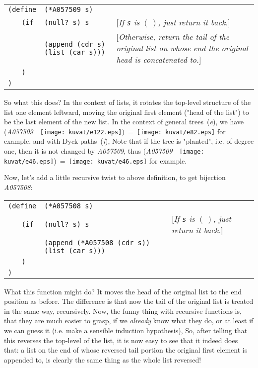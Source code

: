 \documentclass[11pt]{article} %
\newcommand{\catint}[1]{({\it #1})}
\newcommand{\autname}[1]{{\it *#1}}
\newcommand{\scmsym}[1]{{\tt{#1}}}
\newcommand{\scmcode}[1]{{\tt{#1}}}
\newenvironment{scmdefinefun5}{\begin{tabular}{l l l l p{5cm}}}{\end{tabular}}
\newcommand{\scmexmcomment}[1]{[\emph{#1}]}
\newcommand{\nilatom}{\ensuremath{\mathbf{(~)}}\xspace}
\begin{document}
\begin{scmdefinefun5}
\multicolumn{2}{l}{\scmcode{(define}} & \multicolumn{2}{l}{\scmcode{(*A057509 s)}}\\
 & \scmcode{(if} & \multicolumn{2}{l}{\scmcode{(null? s) s}}
 & \scmexmcomment{If \scmsym{s} is \nilatom, just return it back.}\\
 &               & \multicolumn{2}{l}{\scmcode{(append (cdr s) (list (car s)))}}
& \scmexmcomment{Otherwise, return the tail of the original list on whose end the original head is concatenated to.}\\
& \scmcode{)}\\
\scmcode{)}\\
\end{scmdefinefun5}
So what this does? In the context of lists, it rotates the top-level structure
of the list one element leftward, moving the original first element
("head of the list") to be the last element of the new list.
In the context of general trees~\catint{e}, we have (\autname{A057509}~~\texttt{[image: kuvat/e122.eps]})~=~\texttt{[image: kuvat/e82.eps]} for example, and with Dyck paths~\catint{i},
Note that if the tree is "planted", i.e. of degree one, then
it is not changed by \autname{A057509},
thus (\autname{A057509}~~\texttt{[image: kuvat/e46.eps]})~=~\texttt{[image: kuvat/e46.eps]} for example.

Now, let's add a little recursive twist to above definition, to get
bijection \autname{A057508}:

\begin{scmdefinefun5}
\multicolumn{2}{l}{\scmcode{(define}} & \multicolumn{2}{l}{\scmcode{(*A057508 s)}}\\
 & \scmcode{(if} & \multicolumn{2}{l}{\scmcode{(null? s) s}}
 & \scmexmcomment{If \scmsym{s} is \nilatom, just return it back.}\\
 &               & \multicolumn{2}{l}{\scmcode{(append (*A057508 (cdr s)) (list (car s)))}}
& \\ %
& \scmcode{)}\\
\scmcode{)}\\
\end{scmdefinefun5}

What this function might do? It moves the head of the original list to the end
position as before. The difference is that now the tail of the original list
is treated in the same way, recursively. Now, the funny thing with recursive
functions is, that they are much easier to grasp, if we \emph{already} know
what they do, or at least if we can guess it (i.e. make a sensible induction
hypothesis),
So, after telling that this reverses the top-level
of the list, it is now easy to see that it indeed does that:
a list on the end of whose reversed tail portion the original first element is
appended to, is clearly the same thing as the whole list reversed!
\end{document}
